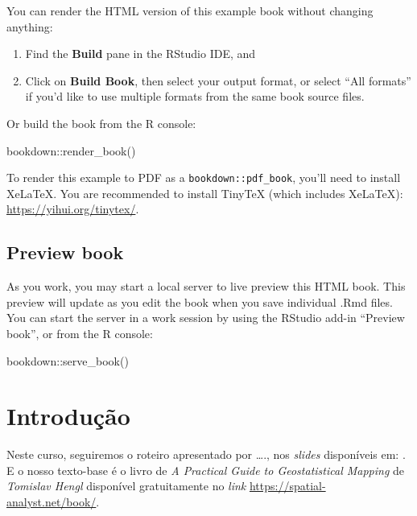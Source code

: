 \documentclass[
]{book}
\newenvironment{Shaded}{\begin{snugshade}}{\end{snugshade}}
\newcommand{\FunctionTok}[1]{\textcolor[rgb]{0.00,0.00,0.00}{#1}}
\newcommand{\NormalTok}[1]{#1}
\newcommand{\SpecialCharTok}[1]{\textcolor[rgb]{0.00,0.00,0.00}{#1}}
\theoremstyle{definition}
\theoremstyle{definition}
\theoremstyle{definition}
\theoremstyle{definition}
\theoremstyle{remark}
\begin{document}
You can render the HTML version of this example book without changing anything:

\begin{enumerate}
\def\labelenumi{\arabic{enumi}.}
\item
  Find the \textbf{Build} pane in the RStudio IDE, and
\item
  Click on \textbf{Build Book}, then select your output format, or select ``All formats'' if you'd like to use multiple formats from the same book source files.
\end{enumerate}

Or build the book from the R console:

\begin{Shaded}
\begin{Highlighting}[]
\NormalTok{bookdown}\SpecialCharTok{::}\FunctionTok{render\_book}\NormalTok{()}
\end{Highlighting}
\end{Shaded}

To render this example to PDF as a \texttt{bookdown::pdf\_book}, you'll need to install XeLaTeX. You are recommended to install TinyTeX (which includes XeLaTeX): \url{https://yihui.org/tinytex/}.

\hypertarget{preview-book}{%
\section{Preview book}\label{preview-book}}

As you work, you may start a local server to live preview this HTML book. This preview will update as you edit the book when you save individual .Rmd files. You can start the server in a work session by using the RStudio add-in ``Preview book'', or from the R console:

\begin{Shaded}
\begin{Highlighting}[]
\NormalTok{bookdown}\SpecialCharTok{::}\FunctionTok{serve\_book}\NormalTok{()}
\end{Highlighting}
\end{Shaded}

\hypertarget{introduuxe7uxe3o}{%
\chapter{Introdução}\label{introduuxe7uxe3o}}

Neste curso, seguiremos o roteiro apresentado por \ldots., nos \emph{slides} disponíveis em: \href{}{}. E o nosso texto-base é o livro de \emph{A Practical Guide to Geostatistical Mapping} de \emph{Tomislav Hengl} disponível gratuitamente no \emph{link} \url{https://spatial-analyst.net/book/}.
\end{document}
